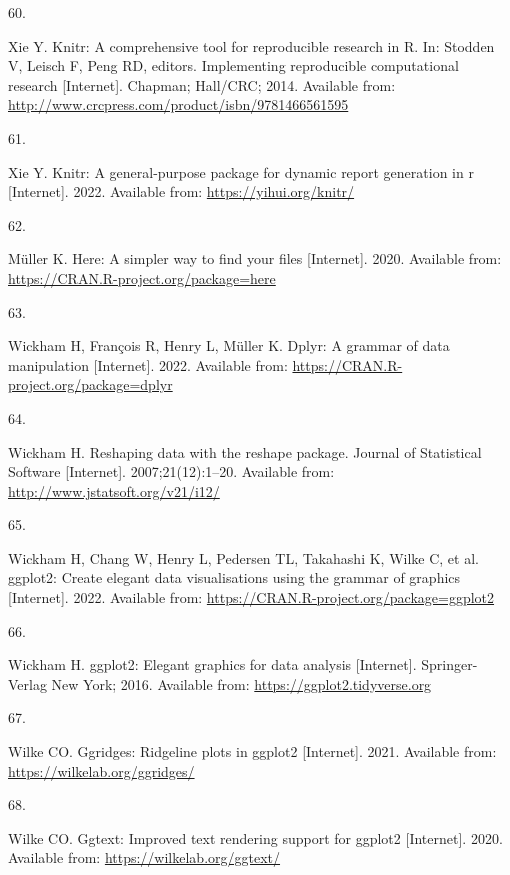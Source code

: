 \documentclass[10pt,a4paper]{article}
\newlength{\cslhangindent}
\newlength{\csllabelwidth}
\newlength{\cslentryspacingunit} %
\newenvironment{CSLReferences}[2] %
 {%
  \setlength{\parindent}{0pt}
  \ifodd #1
  \let\oldpar\par
  \def\par{\hangindent=\cslhangindent\oldpar}
  \fi
  \setlength{\parskip}{#2\cslentryspacingunit}
 }%
 {}
\newcommand{\CSLLeftMargin}[1]{\parbox[t]{\csllabelwidth}{#1}}
\newcommand{\CSLRightInline}[1]{\parbox[t]{\linewidth - \csllabelwidth}{#1}\break}
\begin{document}
\begin{CSLReferences}{0}{0}
\leavevmode{}%
\CSLLeftMargin{60. }
\CSLRightInline{Xie Y. Knitr: A comprehensive tool for reproducible research in {R}. In: Stodden V, Leisch F, Peng RD, editors. Implementing reproducible computational research {[}Internet{]}. Chapman; Hall/CRC; 2014. Available from: \url{http://www.crcpress.com/product/isbn/9781466561595}}

\leavevmode{}%
\CSLLeftMargin{61. }
\CSLRightInline{Xie Y. Knitr: A general-purpose package for dynamic report generation in r {[}Internet{]}. 2022. Available from: \url{https://yihui.org/knitr/}}

\leavevmode{}%
\CSLLeftMargin{62. }
\CSLRightInline{Müller K. Here: A simpler way to find your files {[}Internet{]}. 2020. Available from: \url{https://CRAN.R-project.org/package=here}}

\leavevmode{}%
\CSLLeftMargin{63. }
\CSLRightInline{Wickham H, François R, Henry L, Müller K. Dplyr: A grammar of data manipulation {[}Internet{]}. 2022. Available from: \url{https://CRAN.R-project.org/package=dplyr}}

\leavevmode{}%
\CSLLeftMargin{64. }
\CSLRightInline{Wickham H. Reshaping data with the {reshape} package. Journal of Statistical Software {[}Internet{]}. 2007;21(12):1--20. Available from: \url{http://www.jstatsoft.org/v21/i12/}}

\leavevmode{}%
\CSLLeftMargin{65. }
\CSLRightInline{Wickham H, Chang W, Henry L, Pedersen TL, Takahashi K, Wilke C, et al. ggplot2: Create elegant data visualisations using the grammar of graphics {[}Internet{]}. 2022. Available from: \url{https://CRAN.R-project.org/package=ggplot2}}

\leavevmode{}%
\CSLLeftMargin{66. }
\CSLRightInline{Wickham H. ggplot2: Elegant graphics for data analysis {[}Internet{]}. Springer-Verlag New York; 2016. Available from: \url{https://ggplot2.tidyverse.org}}

\leavevmode{}%
\CSLLeftMargin{67. }
\CSLRightInline{Wilke CO. Ggridges: Ridgeline plots in ggplot2 {[}Internet{]}. 2021. Available from: \url{https://wilkelab.org/ggridges/}}

\leavevmode{}%
\CSLLeftMargin{68. }
\CSLRightInline{Wilke CO. Ggtext: Improved text rendering support for ggplot2 {[}Internet{]}. 2020. Available from: \url{https://wilkelab.org/ggtext/}}


\end{CSLReferences}
\end{document}

